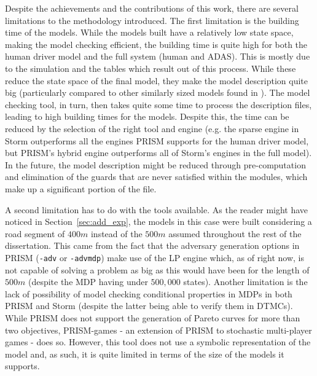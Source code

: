 Despite the achievements and the contributions of this work, there are several limitations to the methodology introduced. The first limitation is the building time of the models. While the models built have a relatively low state space, making the model checking efficient, the building time is quite high for both the human driver model and the full system (human and ADAS). This is mostly due to the simulation and the tables which result out of this process. While these reduce the state space of the final model, they make the model description quite big (particularly compared to other similarly sized models found in \cite{lam, games}). The model checking tool, in turn, then takes quite some time to process the description files, leading to high building times for the models. Despite this, the time can be reduced by the selection of the right tool and engine (e.g. the sparse engine in Storm outperforms all the engines PRISM supports for the human driver model, but PRISM's hybrid engine outperforms all of Storm's engines in the full model). In the future, the model description might be reduced through pre-computation and elimination of the guards that are never satisfied within the modules, which make up a significant portion of the file.

A second limitation has to do with the tools available. As the reader might have noticed in Section~\ref{sec:add_exp}, the models in this case were built considering a road segment of $400m$ instead of the $500m$ assumed throughout the rest of the dissertation. This came from the fact that the adversary generation options in PRISM (\texttt{-adv} or \texttt{-advmdp}) make use of the LP engine which, as of right now, is not capable of solving a problem as big as this would have been for the length of $500m$ (despite the MDP having under $500,000$ states). Another limitation is the lack of possibility of model checking conditional properties in MDPs in both PRISM and Storm (despite the latter being able to verify them in DTMCs). While PRISM does not support the generation of Pareto curves for more than two objectives, PRISM-games - an extension of PRISM to stochastic multi-player games \cite{prism_games} - does so. However, this tool does not use a symbolic representation of the model and, as such, it is quite limited in terms of the size of the models it supports. 

